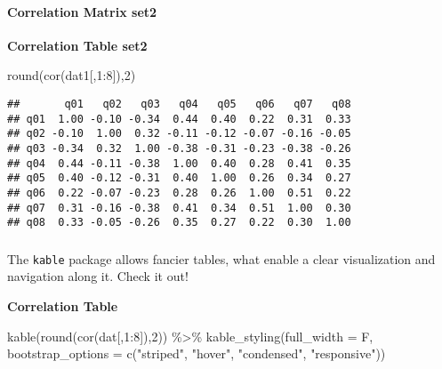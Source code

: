 \documentclass[
]{article}
\newenvironment{Shaded}{\begin{snugshade}}{\end{snugshade}}
\newcommand{\AttributeTok}[1]{\textcolor[rgb]{0.77,0.63,0.00}{#1}}
\newcommand{\DecValTok}[1]{\textcolor[rgb]{0.00,0.00,0.81}{#1}}
\newcommand{\FunctionTok}[1]{\textcolor[rgb]{0.00,0.00,0.00}{#1}}
\newcommand{\NormalTok}[1]{#1}
\newcommand{\SpecialCharTok}[1]{\textcolor[rgb]{0.00,0.00,0.00}{#1}}
\newcommand{\StringTok}[1]{\textcolor[rgb]{0.31,0.60,0.02}{#1}}
\begin{document}
\hypertarget{correlation-matrix-set2}{%
\paragraph{Correlation Matrix set2}\label{correlation-matrix-set2}}

\textbf{Correlation Table set2}

\begin{Shaded}
\begin{Highlighting}[]
\FunctionTok{round}\NormalTok{(}\FunctionTok{cor}\NormalTok{(dat1[,}\DecValTok{1}\SpecialCharTok{:}\DecValTok{8}\NormalTok{]),}\DecValTok{2}\NormalTok{)}
\end{Highlighting}
\end{Shaded}

\begin{verbatim}
##       q01   q02   q03   q04   q05   q06   q07   q08
## q01  1.00 -0.10 -0.34  0.44  0.40  0.22  0.31  0.33
## q02 -0.10  1.00  0.32 -0.11 -0.12 -0.07 -0.16 -0.05
## q03 -0.34  0.32  1.00 -0.38 -0.31 -0.23 -0.38 -0.26
## q04  0.44 -0.11 -0.38  1.00  0.40  0.28  0.41  0.35
## q05  0.40 -0.12 -0.31  0.40  1.00  0.26  0.34  0.27
## q06  0.22 -0.07 -0.23  0.28  0.26  1.00  0.51  0.22
## q07  0.31 -0.16 -0.38  0.41  0.34  0.51  1.00  0.30
## q08  0.33 -0.05 -0.26  0.35  0.27  0.22  0.30  1.00
\end{verbatim}

\hypertarget{section-1}{%
\subsubsection*{}\label{section-1}}

The \texttt{kable} package allows fancier tables, what enable a clear
visualization and navigation along it. Check it out!

\textbf{Correlation Table}

\begin{Shaded}
\begin{Highlighting}[]
\FunctionTok{kable}\NormalTok{(}\FunctionTok{round}\NormalTok{(}\FunctionTok{cor}\NormalTok{(dat[,}\DecValTok{1}\SpecialCharTok{:}\DecValTok{8}\NormalTok{]),}\DecValTok{2}\NormalTok{)) }\SpecialCharTok{\%\textgreater{}\%}
  \FunctionTok{kable\_styling}\NormalTok{(}\AttributeTok{full\_width =}\NormalTok{ F, }\AttributeTok{bootstrap\_options =} \FunctionTok{c}\NormalTok{(}\StringTok{"striped"}\NormalTok{, }\StringTok{"hover"}\NormalTok{, }\StringTok{"condensed"}\NormalTok{, }\StringTok{"responsive"}\NormalTok{))}
\end{Highlighting}
\end{Shaded}
\end{document}
